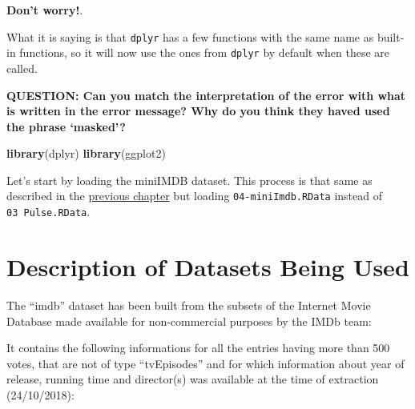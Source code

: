 \documentclass[]{book}
\newenvironment{Shaded}{\begin{snugshade}}{\end{snugshade}}
\newcommand{\KeywordTok}[1]{\textcolor[rgb]{0.13,0.29,0.53}{\textbf{#1}}}
\newcommand{\NormalTok}[1]{#1}
\begin{document}
\textbf{Don't worry!}.

What it is saying is that \texttt{dplyr} has a few functions with the same name as built-in functions, so it will now use the ones from \texttt{dplyr} by default when these are called.

\textbf{QUESTION: Can you match the interpretation of the error with what is written in the error message? Why do you think they haved used the phrase `masked'?}

\begin{Shaded}
\begin{Highlighting}[]
\KeywordTok{library}\NormalTok{(dplyr)}
\KeywordTok{library}\NormalTok{(ggplot2)}
\end{Highlighting}
\end{Shaded}

Let's start by loading the miniIMDB dataset. This process is that same as described in the \protect\hyperlink{ggplot2_setting_up}{previous chapter} but loading \texttt{04-miniImdb.RData} instead of \texttt{03\ Pulse.RData}.

\hypertarget{description-of-datasets-being-used}{%
\section{Description of Datasets Being Used}\label{description-of-datasets-being-used}}

The ``imdb'' dataset has been built from the subsets of the Internet Movie Database made available for non-commercial purposes by the IMDb team: \citet{imdb}

It contains the following informations for all the entries having more than 500 votes, that are not of type ``tvEpisodes'' and for which information about year of release, running time and director(s) was available at the time of extraction (24/10/2018):
\end{document}
